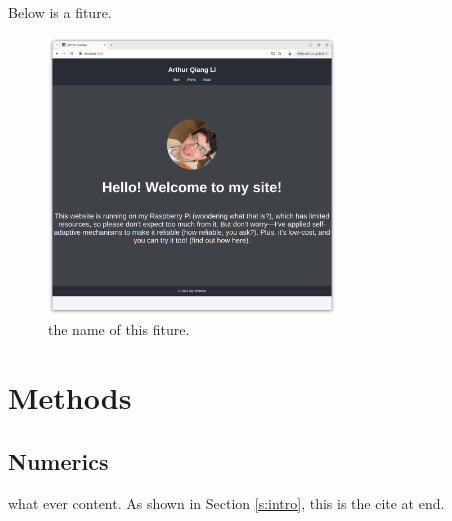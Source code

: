 \documentclass[letterpaper, 11pt]{article}
\begin{document}
Below is a fiture.
\begin{figure}[htpb]
    \centering
    \includegraphics[width=3in]{./media/Screenshot from 2024-11-11 00-41-15.png}
    \caption{the name of this fiture.}
    \label{f:homepage}
\end{figure}

\section{Methods}

\subsection{Numerics}
 
what ever content. As shown in Section \ref{s:intro}, this is the cite at \cite{LIGNELL_2007A, Bockhorn_1994} end.





\end{document}
